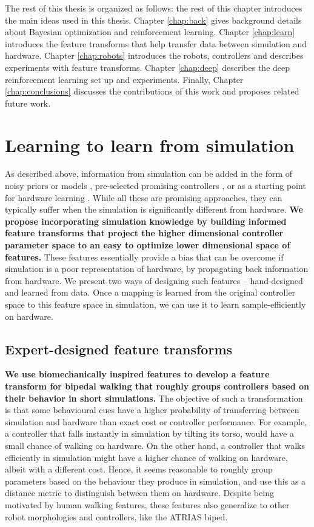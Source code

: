 The rest of this thesis is organized as follows: the rest of this chapter introduces the main ideas used in this thesis. Chapter \ref{chap:back} gives background details about Bayesian optimization and reinforcement learning. Chapter \ref{chap:learn} introduces the feature transforms that help transfer data between simulation and hardware. Chapter \ref{chap:robots} introduces the robots, controllers and describes experiments with feature transforms. Chapter \ref{chap:deep} describes the deep reinforcement learning set up and experiments. Finally, Chapter \ref{chap:conclusions} discusses the contributions of this work and proposes related future work.

\section{Learning to learn from simulation}

As described above, information from simulation can be added in the form of noisy priors or models \citep{wilson2014using}, pre-selected promising controllers \citep{cully2015robots}, or as a starting point for hardware learning \citep{endo2008learning}. While all these are promising approaches, they can typically suffer when the simulation is significantly different from hardware. 
\textbf{We propose incorporating simulation knowledge by building informed feature transforms that project the higher dimensional controller parameter space to an easy to optimize lower dimensional space of features.} These features essentially provide a bias that can be overcome if simulation is a poor representation of hardware, by propagating back information from hardware. We present two ways of designing such features -- hand-designed and learned from data. Once a mapping is learned from the original controller space to this feature space in simulation, we can use it to learn sample-efficiently on hardware.


 \subsection{Expert-designed feature transforms}
 \textbf{We use biomechanically inspired features to develop a feature transform for bipedal walking that roughly groups controllers based on their behavior in short simulations.} The objective of such a transformation is that some behavioural cues have a higher probability of transferring between simulation and hardware than exact cost or controller performance. For example, a controller that falls instantly in simulation by tilting its torso, would have a small chance of walking on hardware. On the other hand, a controller that walks efficiently in simulation might have a higher chance of walking on hardware, albeit with a different cost. Hence, it seems reasonable to roughly group parameters based on the behaviour they produce in simulation, and use this as a distance metric to distinguish between them on hardware. Despite being motivated by human walking features, these features also generalize to other robot morphologies and controllers, like the ATRIAS biped. 
 

